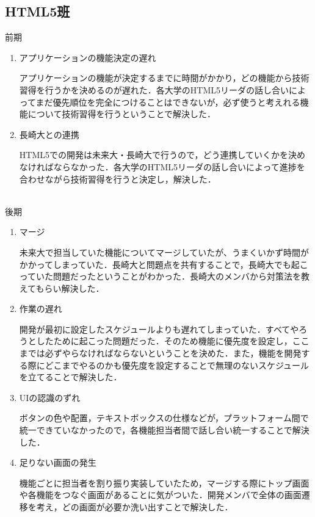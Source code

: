 \subsection{HTML5班}
前期
\\
\begin{enumerate}
\item アプリケーションの機能決定の遅れ
\par
アプリケーションの機能が決定するまでに時間がかかり，どの機能から技術習得を行うかを決めるのが遅れた．各大学のHTML5リーダの話し合いによってまだ優先順位を完全につけることはできないが，必ず使うと考えれる機能について技術習得を行うということで解決した．
\item 長崎大との連携
\par
HTML5での開発は未来大・長崎大で行うので，どう連携していくかを決めなければならなかった．各大学のHTML5リーダの話し合いによって進捗を合わせながら技術習得を行うと決定し，解決した．
\end{enumerate}
\\
後期
\\
\begin{enumerate}
\item マージ
\par
未来大で担当していた機能についてマージしていたが、うまくいかず時間がかかってしまっていた．長崎大と問題点を共有することで，長崎大でも起こっていた問題だったということがわかった．長崎大のメンバから対策法を教えてもらい解決した．
\item 作業の遅れ
\par
開発が最初に設定したスケジュールよりも遅れてしまっていた．すべてやろうとしたために起こった問題だった．そのため機能に優先度を設定し，ここまでは必ずやらなければならないということを決めた．また，機能を開発する際にどこまでやるのかも優先度を設定することで無理のないスケジュールを立てることで解決した．
\item UIの認識のずれ
\par
ボタンの色や配置，テキストボックスの仕様などが，プラットフォーム間で統一できていなかったので，各機能担当者間で話し合い統一することで解決した．
\item 足りない画面の発生
\par 
機能ごとに担当者を割り振り実装していたため，マージする際にトップ画面や各機能をつなぐ画面があることに気がついた．開発メンバで全体の画面遷移を考え，どの画面が必要か洗い出すことで解決した．
\end{enumerate}
